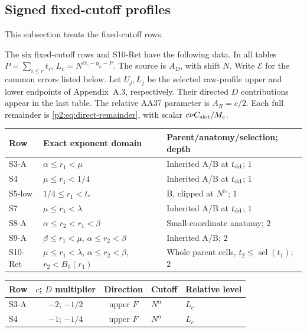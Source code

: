 \subsection{Signed fixed-cutoff profiles}
\label{p2:sec:2.3}\label{p2:sec:2.4}\label{p2:sec:2.5}\label{p2:sec:2.6}\label{p2:sec:2.7}\label{p2:sec:2.8}\label{p2:sec:2.9}
This subsection treats the fixed-cutoff rows.
\begin{lemma}
The six fixed-cutoff rows and S10-Ret have the following data.
In all tables $P=\sum_{i\le r}t_i$, $L_c=N^{\Theta_c-\eta_L-P}$.
The source is $A_D$, with shift $N$.
Write $\mathcal E$ for the common errors listed below.
Let $U_j,L_j$ be the selected raw-profile upper and lower endpoints
of Appendix~A.3, respectively.
Their directed $D$ contributions appear in the last table.
The relative AA37 parameter is $A_R=c/2$.
Each full remainder is \eqref{p2:eq:direct-remainder}, with scalar $c\nu C_{\rm slot}/M_c$.
\begin{center}
\small
\begin{tabularx}{\textwidth}{@{}lXX@{}}\toprule
Row & Exact exponent domain & Parent/anatomy/selection; depth\\\midrule
S3-A & $\alpha\le r_1<\mu$ & Inherited A/B at $t_{\rm dd}$; $1$\\
S4 & $\mu\le r_1<1/4$ & Inherited A/B at $t_{\rm dd}$; $1$\\
S5-low & $1/4\le r_1<t_*$ & B, clipped at $N^{t_*}$; $1$\\
S7 & $\mu\le r_1<\lambda$ & Inherited A/B at $t_{\rm dd}$; $1$\\
S8-A & $\alpha\le r_2<r_1<\beta$ & Small-coordinate anatomy; $2$\\
S9-A & $\beta\le r_1<\mu$, $\alpha\le r_2<\beta$ & Inherited A/B; $2$\\
S10-Ret & $\mu\le r_1<\lambda$,\newline
$\alpha\le r_2<\beta$,\newline $r_2<B_0(r_1)$
 & Whole parent cells, $t_2\le\operatorname{sel}(t_1)$; $2$\\\bottomrule
\end{tabularx}
\end{center}
\begin{center}
\small
\begin{tabular}{@{}lccll@{}}\toprule
Row & $c$; $D$ multiplier & Direction & Cutoff & Relative level\\\midrule
S3-A & $-2$; $-1/2$ & upper $F$ & $N^\alpha$ & $L_c$\\
S4 & $-1$; $-1/4$ & upper $F$ & $N^\alpha$ & $L_c$\\

\end{tabular}
\end{center}
\end{lemma}
